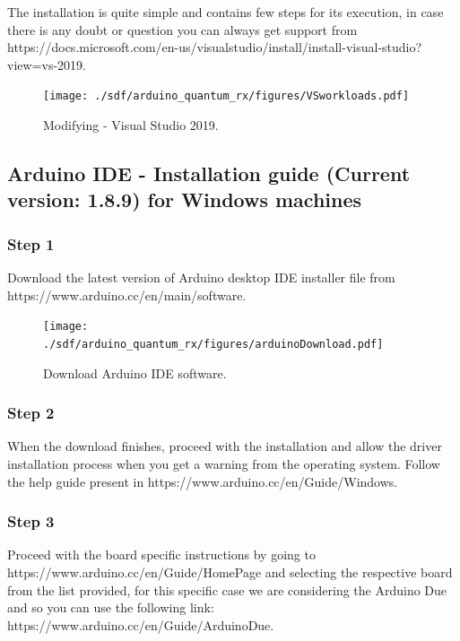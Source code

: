 \begin{refsection}
	The installation is quite simple and contains few steps for its execution, in case there is any doubt or question you can always get support from https://docs.microsoft.com/en-us/visualstudio/install/install-visual-studio?view=vs-2019.
	
	\begin{figure}[H]
		\centering
		\texttt{[image: ./sdf/arduino\_quantum\_rx/figures/VSworkloads.pdf]}
		\caption{Modifying - Visual Studio 2019.}
		\label{vstudioWorkloads}
	\end{figure}
	
	\subsection{Arduino IDE - Installation guide (Current version: 1.8.9) for Windows machines}
	
	\subsubsection{Step 1}
	
	Download the latest version of Arduino desktop IDE installer file from https://www.arduino.cc/en/main/software.
	
	\begin{figure}[H]
		\centering
		\texttt{[image: ./sdf/arduino\_quantum\_rx/figures/arduinoDownload.pdf]}
		\caption{Download Arduino IDE software.}
		\label{arduinoDownload}
	\end{figure}
	
	
	\subsubsection{Step 2}
	
	When the download finishes, proceed with the installation and allow the driver installation process when you get a warning from the operating system. Follow the help guide present in https://www.arduino.cc/en/Guide/Windows.
	
	\subsubsection{Step 3}
	
	Proceed with the board specific instructions by going to https://www.arduino.cc/en/Guide/HomePage and selecting the respective board from the list provided, for this specific case we are considering the Arduino Due and so you can use the following link: https://www.arduino.cc/en/Guide/ArduinoDue.
	

\end{refsection}
